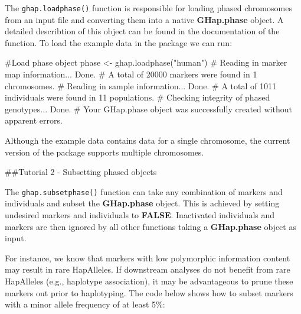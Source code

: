 \documentclass[
]{article}
\newenvironment{Shaded}{}{}
\newcommand{\CommentTok}[1]{\textcolor[rgb]{0.00,0.50,0.00}{#1}}
\newcommand{\DataTypeTok}[1]{#1}
\newcommand{\DecValTok}[1]{#1}
\newcommand{\FloatTok}[1]{#1}
\newcommand{\KeywordTok}[1]{\textcolor[rgb]{0.00,0.00,1.00}{#1}}
\newcommand{\NormalTok}[1]{#1}
\newcommand{\OperatorTok}[1]{#1}
\newcommand{\StringTok}[1]{\textcolor[rgb]{0.00,0.50,0.50}{#1}}
\begin{document}
The \texttt{ghap.loadphase()} function is responsible for loading phased
chromosomes from an input file and converting them into a native
\textbf{GHap.phase} object. A detailed describtion of this object can be
found in the documentation of the function. To load the example data in
the package we can run:

\begin{Shaded}
\begin{Highlighting}[]
\CommentTok{#Load phase object}
\NormalTok{phase <-}\StringTok{ }\KeywordTok{ghap.loadphase}\NormalTok{(}\StringTok{"human"}\NormalTok{)}
\CommentTok{#   Reading in marker map information... Done.}
\CommentTok{#   A total of 20000 markers were found in 1 chromosomes.}
\CommentTok{#   Reading in sample information... Done.}
\CommentTok{#   A total of 1011 individuals were found in 11 populations.}
\CommentTok{#   Checking integrity of phased genotypes... Done.}
\CommentTok{#   Your GHap.phase object was successfully created without apparent errors.}
\end{Highlighting}
\end{Shaded}

Although the example data contains data for a single chromosome, the
current version of the package supports multiple chromosomes.

\pagebreak

\#\#Tutorial 2 - Subsetting phased objects

The \texttt{ghap.subsetphase()} function can take any combination of
markers and individuals and subset the \textbf{GHap.phase} object. This
is achieved by setting undesired markers and individuals to
\textbf{FALSE}. Inactivated individuals and markers are then ignored by
all other functions taking a \textbf{GHap.phase} object as input.

For instance, we know that markers with low polymorphic information
content may result in rare HapAlleles. If downstream analyses do not
benefit from rare HapAlleles (e.g., haplotype association), it may be
advantageous to prune these markers out prior to haplotyping. The code
below shows how to subset markers with a minor allele frequency of at
least 5\%:

\begin{Shaded}
\end{Shaded}
\end{document}
